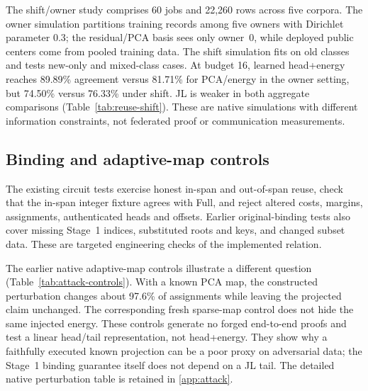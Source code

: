 The shift/owner study comprises 60 jobs and 22,260 rows across five corpora. The owner simulation partitions training records among five owners with Dirichlet parameter 0.3; the residual/PCA basis sees only owner~0, while deployed public centers come from pooled training data. The shift simulation fits on old classes and tests new-only and mixed-class cases. At budget 16, learned head+energy reaches 89.89\% agreement versus 81.71\% for PCA/energy in the owner setting, but 74.50\% versus 76.33\% under shift. JL is weaker in both aggregate comparisons (Table~\ref{tab:reuse-shift}). These are native simulations with different information constraints, not federated proof or communication measurements.


\subsection{Binding and adaptive-map controls}
The existing circuit tests exercise honest in-span and out-of-span reuse, check that the in-span integer fixture agrees with Full, and reject altered costs, margins, assignments, authenticated heads and offsets. Earlier original-binding tests also cover missing Stage~1 indices, substituted roots and keys, and changed subset data. These are targeted engineering checks of the implemented relation.

The earlier native adaptive-map controls illustrate a different question (Table~\ref{tab:attack-controls}). With a known PCA map, the constructed perturbation changes about 97.6\% of assignments while leaving the projected claim unchanged. The corresponding fresh sparse-map control does not hide the same injected energy. These controls generate no forged end-to-end proofs and test a linear head/tail representation, not head+energy. They show why a faithfully executed known projection can be a poor proxy on adversarial data; the Stage~1 binding guarantee itself does not depend on a JL tail.
The detailed native perturbation table is retained in \ref{app:attack}.
